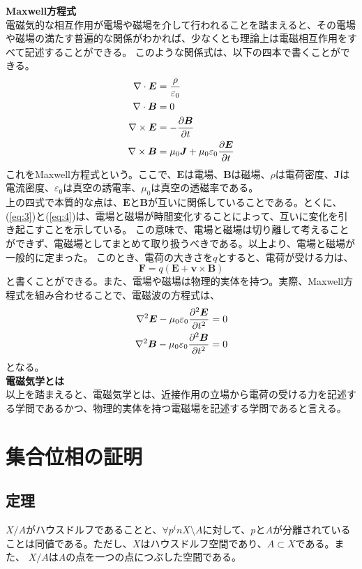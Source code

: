 \documentclass[a4paper,11pt]{jsarticle}
\numberwithin{equation}{section}
\begin{document}
\textbf{Maxwell方程式}\\
電磁気的な相互作用が電場や磁場を介して行われることを踏まえると、その電場や磁場の満たす普遍的な関係がわかれば、少なくとも理論上は電磁相互作用をすべて記述することができる。
このような関係式は、以下の四本で書くことができる。
\begin{align}
  \nabla \cdot \bm{E} &= \frac{\rho}{\varepsilon_0} \label{eq:1}\\
  \nabla \cdot \bm{B} &= 0 \label{eq:2}\\
  \nabla \times \bm{E} &= -\pdv{\bm{B}}{t} \label{eq:3}\\
  \nabla \times \bm{B} &= \mu_0 \bm{J} + \mu_0 \varepsilon_0 \pdv{\bm{E}}{t} \label{eq:4}
\end{align}
これをMaxwell方程式という。ここで、\(\bm{E}\)は電場、\(\bm{B}\)は磁場、\(\rho\)は電荷密度、\(\bm{J}\)は電流密度、\(\varepsilon_0\)は真空の誘電率、\(\mu_0\)は真空の透磁率である。\\
上の四式で本質的な点は、\(\bm{E}\)と\(\bm{B}\)が互いに関係していることである。とくに、(\ref{eq:3})と(\ref{eq:4})は、電場と磁場が時間変化することによって、互いに変化を引き起こすことを示している。
この意味で、電場と磁場は切り離して考えることができず、電磁場としてまとめて取り扱うべきである。以上より、電場と磁場が一般的に定まった。
このとき、電荷の大きさを$q$とすると、電荷が受ける力は、
\begin{equation}
  \bm{F} = q(\bm{E} + \bm{v} \times \bm{B})
\end{equation}
と書くことができる。また、電場や磁場は物理的実体を持つ。実際、Maxwell方程式を組み合わせることで、電磁波の方程式は、
\begin{align}
  \nabla^2 \bm{E} - \mu_0 \varepsilon_0 \pdv[2]{\bm{E}}{t} &= 0\\
  \nabla^2 \bm{B} - \mu_0 \varepsilon_0 \pdv[2]{\bm{B}}{t} &= 0
\end{align}
となる。\\

\textbf{電磁気学とは}\\
以上を踏まえると、電磁気学とは、近接作用の立場から電荷の受ける力を記述する学問であるかつ、物理的実体を持つ電磁場を記述する学問であると言える。\\

\section{集合位相の証明}
\subsection{定理}
$X/A$がハウスドルフであることと、$\forall p ^in X\setminus A$に対して、$p$と$A$が分離されていることは同値である。ただし、$X$はハウスドルフ空間であり、$A \subset X$である。また、
$X/A$は$A$の点を一つの点につぶした空間である。\\
\end{document}
